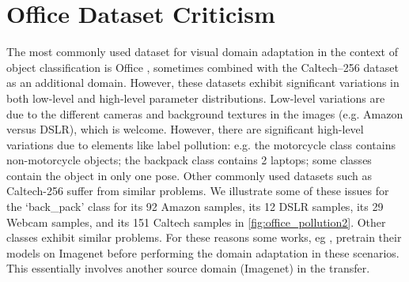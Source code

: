 \documentclass{article}
\begin{document}
\section{Office Dataset Criticism}
The most commonly used dataset for visual domain adaptation in the context of object classification is Office \cite{saenko2010adapting}, sometimes combined with the Caltech--256 dataset \cite{griffin2007caltech} as an additional domain. However, these datasets exhibit significant variations in both low-level and high-level parameter distributions. Low-level variations are due to the different cameras and background textures in the images (e.g. Amazon versus DSLR), which is welcome. However, there are significant high-level variations due to elements like label pollution: e.g. the motorcycle class contains non-motorcycle objects; the backpack class contains 2 laptops; some classes contain the object in only one pose. Other commonly used datasets such as Caltech-256 suffer from similar problems. We illustrate some of these issues for the `back\_pack' class for its 92 Amazon samples, its 12 DSLR samples, its 29 Webcam samples, and its 151 Caltech samples in \autoref{fig:office_pollution2}. Other classes exhibit similar problems. For these reasons some works, eg \cite{sun2015return}, pretrain their models on Imagenet before performing the domain adaptation in these scenarios. This essentially involves another source domain (Imagenet) in the transfer.
\end{document}
